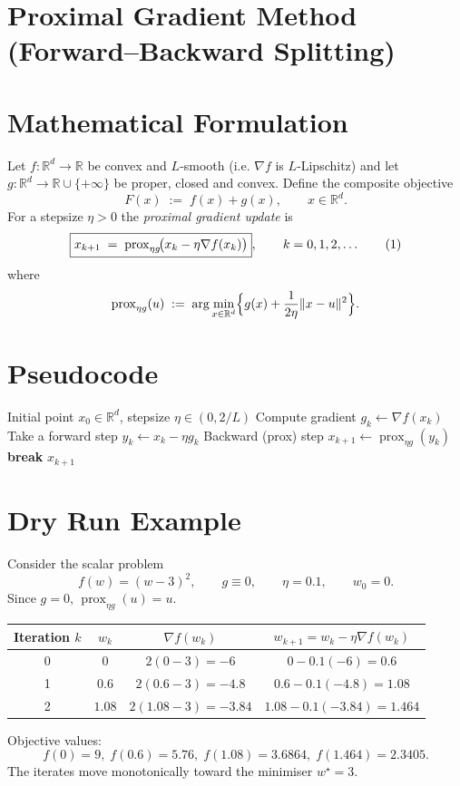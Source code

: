 \documentclass{article}
\newcommand{\prox}{\operatorname{prox}}
\newcommand{\R}{\mathbb{R}}
\begin{document}
\section*{Proximal Gradient Method (Forward–Backward Splitting)}

\section*{Mathematical Formulation}
Let $f:\R^{d}\!\to\!\R$ be convex and $L$‑smooth (i.e. $\nabla f$ is $L$‑Lipschitz) and let $g:\R^{d}\!\to\!\R\cup\{+\infty\}$ be proper, closed and convex.  
Define the composite objective
\[
F(x)\;:=\;f(x)+g(x),\qquad x\in\R^{d}.
\]
For a stepsize $\eta>0$ the \emph{proximal gradient update} is
\begin{equation}
\boxed{%
x_{k+1}\;=\;\prox_{\eta g}\!\bigl(x_{k}-\eta\nabla f(x_{k})\bigr)},
\qquad k=0,1,2,\dots
\tag{1}
\end{equation}
where
\[
\prox_{\eta g}(u)\;:=\;\arg\min_{x\in\R^{d}}\Bigl\{ g(x)+\frac{1}{2\eta}\|x-u\|^{2}\Bigr\}.
\]

\section*{Pseudocode}
\begin{algorithm}[H]
\caption{Proximal Gradient Method}
\begin{algorithmic}[1]
\REQUIRE Initial point $x_{0}\in\R^{d}$, stepsize $\eta\in(0,2/L)$
    \STATE Compute gradient $g_{k}\gets\nabla f(x_{k})$
    \STATE Take a forward step $y_{k}\gets x_{k}-\eta g_{k}$
    \STATE Backward (prox) step $x_{k+1}\gets\prox_{\eta g}(y_{k})$
        \STATE \textbf{break}
    \ENDIF
\ENDFOR
\RETURN $x_{k+1}$
\end{algorithmic}
\end{algorithm}

\section*{Dry Run Example}
Consider the scalar problem
\[
f(w)=(w-3)^{2},\qquad g\equiv0,\qquad \eta=0.1,\qquad w_{0}=0.
\]
Since $g=0$, $\prox_{\eta g}(u)=u$.

\begin{center}
\begin{tabular}{c|c|c|c}
Iteration $k$ & $w_{k}$ & $\nabla f(w_{k})$ & $w_{k+1}=w_{k}-\eta\nabla f(w_{k})$ \\ \hline
0 & $0$ & $2(0-3)=-6$ & $0-0.1(-6)=0.6$ \\
1 & $0.6$ & $2(0.6-3)=-4.8$ & $0.6-0.1(-4.8)=1.08$ \\
2 & $1.08$ & $2(1.08-3)=-3.84$ & $1.08-0.1(-3.84)=1.464$ \\
\end{tabular}
\end{center}
Objective values:
\[
f(0)=9,\; f(0.6)=5.76,\; f(1.08)=3.6864,\; f(1.464)=2.3405.
\]
The iterates move monotonically toward the minimiser $w^{\star}=3$.
\end{document}
